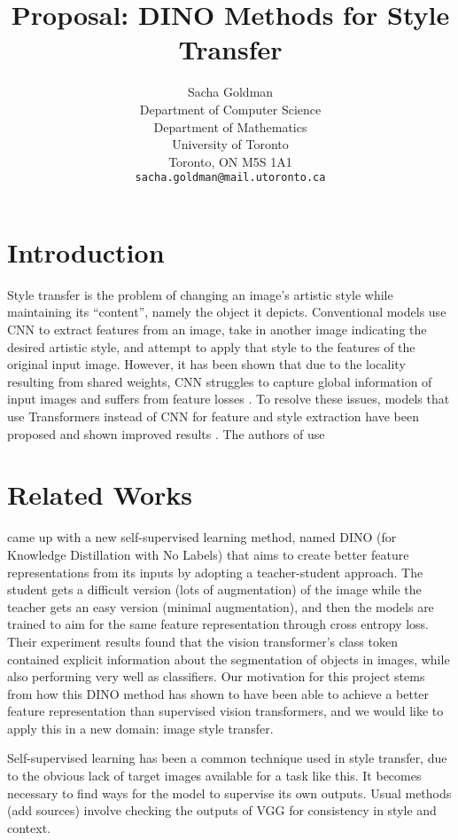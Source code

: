 \documentclass{article}
\title{Proposal: DINO Methods for Style Transfer}
\author{
  Sacha Goldman \\
  Department of Computer Science\\ 
  Department of Mathematics\\
  University of Toronto\\
  Toronto, ON M5S 1A1 \\
  \texttt{sacha.goldman@mail.utoronto.ca} \\
}
\begin{document}
\maketitle

\begin{abstract}

\end{abstract}

\section{Introduction}
Style transfer is the problem of changing an image's artistic style while maintaining its ``content'', namely the object it depicts. Conventional models use CNN to extract features from an image, take in another image indicating the desired artistic style, and attempt to apply that style to the features of the original input image. However, it has been shown that due to the locality resulting from shared weights, CNN struggles to capture global information of input images and suffers from feature losses \cite{ImageStyleTransformer}. To resolve these issues, models that use Transformers instead of CNN for feature and style extraction have been proposed and shown improved results \cite{ImageStyleTransformer}. The authors of \cite{ImageStyleTransformer} use 


\section{Related Works}

\cite{dino} came up with a new self-supervised learning method, named DINO (for Knowledge Distillation with No Labels) that aims to create better feature representations from its inputs by adopting a teacher-student approach. The student gets a difficult version (lots of augmentation) of the image while the teacher gets an easy version (minimal augmentation), and then the models are trained to aim for the same feature representation through cross entropy loss. Their experiment results found that the vision transformer's class token contained explicit information about the segmentation of objects in images, while also performing very well as classifiers. Our motivation for this project stems from how this DINO method has shown to have been able to achieve a better feature representation than supervised vision transformers, and we would like to apply this in a new domain: image style transfer.

Self-supervised learning has been a common technique used in style transfer, due to the obvious lack of target images available for a task like this. It becomes necessary to find ways for the model to supervise its own outputs. Usual methods (add sources) involve checking the outputs of VGG for consistency in style and context. 
\end{document}
